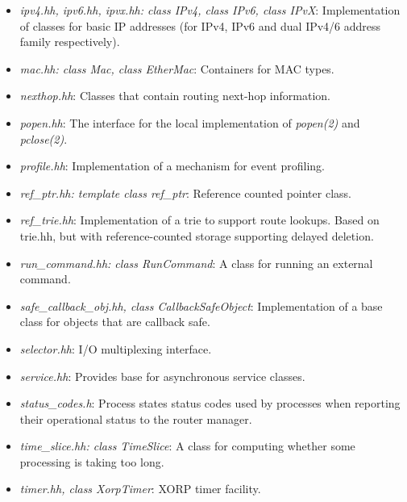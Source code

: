 \documentclass[11pt]{article}
\begin{document}
\begin{itemize}
  \item \emph{ipv4.hh, ipv6.hh, ipvx.hh: class
  IPv4, class IPv6, class IPvX}: Implementation of classes for
  basic IP addresses (for IPv4, IPv6 and dual IPv4/6 address family
  respectively).

  \item \emph{mac.hh: class Mac, class EtherMac}: Containers for
  MAC types.

  \item \emph{nexthop.hh}: Classes that contain routing next-hop
  information.

  \item \emph{popen.hh}: The interface for the local implementation
  of \emph{popen(2)} and \emph{pclose(2)}.

  \item \emph{profile.hh}: Implementation of a mechanism for event profiling.

  \item \emph{ref\_ptr.hh: template class ref\_ptr}: Reference counted
  pointer class.

  \item \emph{ref\_trie.hh}: Implementation of a trie to support route
  lookups.  Based on trie.hh, but with reference-counted storage
  supporting delayed deletion.

  \item \emph{run\_command.hh: class RunCommand}: A class for running an
  external command.

  \item \emph{safe\_callback\_obj.hh, class CallbackSafeObject}:
  Implementation of a base class for objects that are callback safe.

  \item \emph{selector.hh}: I/O multiplexing interface.

  \item \emph{service.hh}: Provides base for asynchronous service classes.

  \item \emph{status\_codes.h}: Process states status codes used by
  processes when reporting their operational status to the router manager.

  \item \emph{time\_slice.hh: class TimeSlice}: A class for computing
  whether some processing is taking too long.

  \item \emph{timer.hh, class XorpTimer}: XORP timer facility.


\end{itemize}
\end{document}
